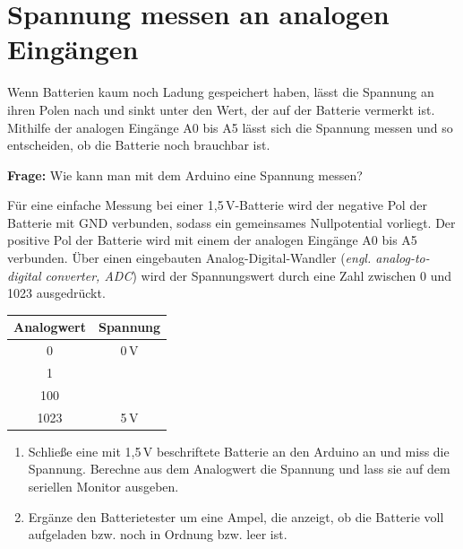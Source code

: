 \documentclass[ngerman, 11pt]{scrreprt}
\begin{document}
	\newpage
	\section*{Spannung messen an analogen Eingängen}
	
	Wenn Batterien kaum noch Ladung gespeichert haben, lässt die Spannung an ihren Polen nach und sinkt unter den Wert, der auf der Batterie vermerkt ist. Mithilfe der analogen Eingänge A0 bis A5 lässt sich die Spannung messen und so entscheiden, ob die Batterie noch brauchbar ist.
	
	\begin{ziel}
		\textbf{Frage:} Wie kann man mit dem Arduino eine Spannung messen?
	\end{ziel}

	\begin{projekt*}[Batterietester ($U<5\,V$)]
		\begin{minipage}{\textwidth}
			\begin{minipage}{0.68\textwidth}
				Für eine einfache Messung bei einer 1,5\,V-Batterie wird der negative Pol der Batterie mit GND verbunden, sodass ein gemeinsames Nullpotential vorliegt. Der positive Pol der Batterie wird mit einem der analogen Eingänge A0 bis A5 verbunden. Über einen eingebauten Analog-Digital-Wandler (\emph{engl. analog-to-digital converter, ADC}) wird der Spannungswert durch eine Zahl zwischen 0 und 1023 ausgedrückt.
			\end{minipage}
			\hfill
			\begin{minipage}{0.3\textwidth}
				\centering
				\begin{tabular}{c | c}
					\textbf{Analogwert} & \textbf{Spannung} \\ \hline
					0 & 0\,V \\ \hline
					1 &  \\ \hline
					100 &  \\ \hline
					1023 & 5\,V \\ \hline
				\end{tabular}
			\end{minipage}
		\end{minipage}
		\begin{enumerate}[label=\alph*), itemsep=0mm, parsep=0mm]
			\item Schließe eine mit 1,5\,V beschriftete Batterie an den Arduino an und miss die Spannung. Berechne aus dem Analogwert die Spannung und lass sie auf dem seriellen Monitor ausgeben.
			\item Ergänze den Batterietester um eine Ampel, die anzeigt, ob die Batterie voll aufgeladen bzw. noch in Ordnung bzw. leer ist.
		\end{enumerate}	
	\end{projekt*}
	
\end{document}
